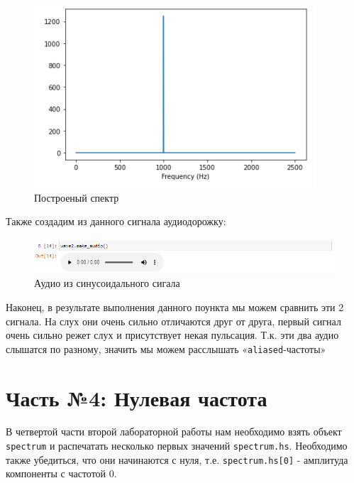 \documentclass[a4paper]{article}
\begin{document}
            \begin{figure}[H]
                \centering
                \includegraphics[width=\textwidth]{ex_3_sin.png}
                \caption{Построеный спектр}
                \label{fig:ex_3_sin}
            \end{figure}
            
            Также создадим из данного сигнала аудиодорожку:
            
            \begin{figure}[H]
                \centering
                \includegraphics[width=\textwidth]{ex_3_sin_audio.png}
                \caption{Аудио из синусоидального сигала}
                \label{fig:ex_3_sin_audio}
            \end{figure}
            
            Наконец, в результате выполнения данного поункта мы можем сравнить эти 2 сигнала. На слух они очень сильно отличаются друг от друга, первый сигнал очень сильно режет слух и присутствует некая пульсация. Т.к. эти два аудио слышатся по разному, значить мы можем расслышать «\texttt{aliased}-частоты»
            
    \newpage
        \section{Часть №4: Нулевая частота}
            В четвертой части второй лабораторной работы нам необходимо взять объект \texttt{spectrum} и распечатать несколько первых значений \texttt{spectrum.hs}. Необходимо также убедиться, что они начинаются с нуля, т.е. \texttt{spectrum.hs[0]} - амплитуда компоненты с частотой 0.
            
\end{document}
